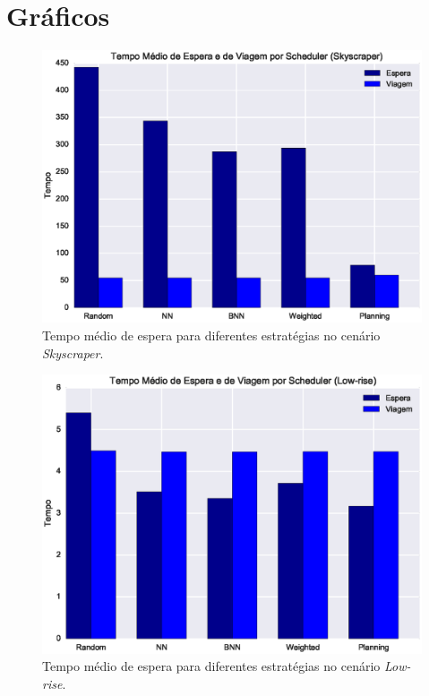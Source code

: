 \section{Gráficos}

\begin{figure}[htb]
  \centering
  \includegraphics[scale=0.8]{img/skyscraper-average-times-chart}
  \caption[{Tempo médio de espera no cenário \textit{Skyscraper}.}]{Tempo médio de espera para diferentes estratégias no cenário \textit{Skyscraper}.}
  \label{fig:result:average:skyscraper}
\end{figure}

\begin{figure}[htb]
  \centering
  \includegraphics[scale=0.8]{img/low-rise-average-times-chart}
  \caption[Tempo médio de espera no cenário \textit{Low-rise}.]{Tempo médio de espera para diferentes estratégias no cenário \textit{Low-rise}.}
  \label{fig:result:average:low-rise}
\end{figure}

